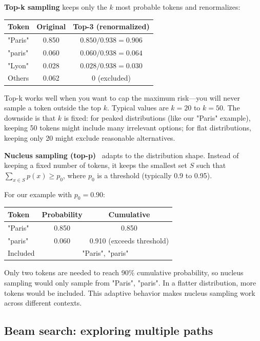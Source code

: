 \textbf{Top-k sampling} keeps only the $k$ most probable tokens and renormalizes:
\begin{center}
\begin{tabular}{lcc}
\toprule
\textbf{Token} & \textbf{Original} & \textbf{Top-3 (renormalized)} \\
\midrule
"Paris" & 0.850 & $0.850 / 0.938 = 0.906$ \\
"paris" & 0.060 & $0.060 / 0.938 = 0.064$ \\
"Lyon" & 0.028 & $0.028 / 0.938 = 0.030$ \\
Others & 0.062 & 0 (excluded) \\
\bottomrule
\end{tabular}
\end{center}

Top-k works well when you want to cap the maximum risk---you will never sample a token outside the top $k$. Typical values are $k=20$ to $k=50$. The downside is that $k$ is fixed: for peaked distributions (like our "Paris" example), keeping 50 tokens might include many irrelevant options; for flat distributions, keeping only 20 might exclude reasonable alternatives.

\textbf{Nucleus sampling (top-p)}~\citep{holtzman2019curious} adapts to the distribution shape. Instead of keeping a fixed number of tokens, it keeps the smallest set $S$ such that $\sum_{x \in S} p(x) \ge p_0$, where $p_0$ is a threshold (typically 0.9 to 0.95).

For our example with $p_0=0.90$:
\begin{center}
\begin{tabular}{lcc}
\toprule
\textbf{Token} & \textbf{Probability} & \textbf{Cumulative} \\
\midrule
"Paris" & 0.850 & 0.850 \\
"paris" & 0.060 & 0.910 (exceeds threshold) \\
\midrule
Included & \multicolumn{2}{c}{"Paris", "paris"} \\
\bottomrule
\end{tabular}
\end{center}

Only two tokens are needed to reach 90\% cumulative probability, so nucleus sampling would only sample from {"Paris", "paris"}. In a flatter distribution, more tokens would be included. This adaptive behavior makes nucleus sampling work across different contexts.

\subsection{Beam search: exploring multiple paths}
\label{sec:beam}

